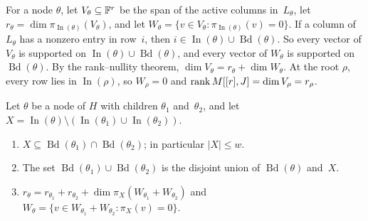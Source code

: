For a node $\theta$, let $V_\theta\subseteq\mathbb{F}^r$ be the span of the active columns in~$L_\theta$, let $r_\theta=\dim\pi_{\operatorname{In}(\theta)}(V_\theta)$, and let $W_\theta=\{v\in V_\theta:\pi_{\operatorname{In}(\theta)}(v)=0\}$.
If a column of $L_\theta$ has a nonzero entry in row~$i$, then $i\in\operatorname{In}(\theta)\cup\operatorname{Bd}(\theta)$.
So every vector of $V_\theta$ is supported on $\operatorname{In}(\theta)\cup\operatorname{Bd}(\theta)$, and every vector of $W_\theta$ is supported on $\operatorname{Bd}(\theta)$.
By the rank--nullity theorem, $\dim V_\theta=r_\theta+\dim W_\theta$.
At the root $\rho$, every row lies in $\operatorname{In}(\rho)$, so $W_\rho=0$ and $\operatorname{rank} M[[r],J]=\dim V_\rho=r_\rho$.

\begin{lemma}\label{lem:merge}
Let $\theta$ be a node of $H$ with children $\theta_1$ and~$\theta_2$, and let $X=\operatorname{In}(\theta)\setminus(\operatorname{In}(\theta_1)\cup\operatorname{In}(\theta_2))$.
\begin{enumerate}[label=(\alph*)]
\item $X\subseteq\operatorname{Bd}(\theta_1)\cap\operatorname{Bd}(\theta_2)$; in particular $|X|\le w$.
\item The set $\operatorname{Bd}(\theta_1)\cup\operatorname{Bd}(\theta_2)$ is the disjoint union of $\operatorname{Bd}(\theta)$ and~$X$.
\item $r_\theta=r_{\theta_1}+r_{\theta_2}+\dim\pi_X(W_{\theta_1}+W_{\theta_2})$ and $W_\theta=\{v\in W_{\theta_1}+W_{\theta_2}:\pi_X(v)=0\}$.
\end{enumerate}
\end{lemma}

